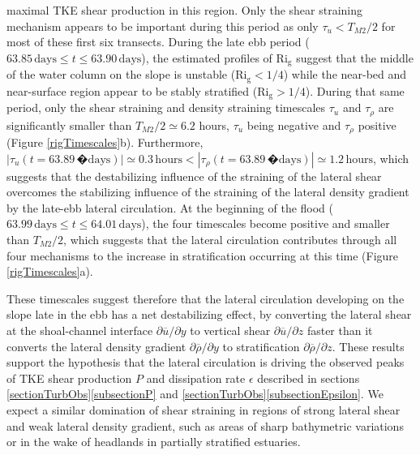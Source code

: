 maximal TKE shear production in this region. Only the shear straining mechanism appears to be important during this period as only $\tau_{u} < T_{M2} / 2$ for most of these first six transects. During the late ebb period ($63.85\, \mathrm{days} \leq t \leq 63.90 \, \mathrm{days}$), the estimated profiles of $\mathrm{Ri_g}$ suggest that the middle of the water column on the slope is unstable ($\mathrm{Ri_g} < 1/4$) while the near-bed and near-surface region appear to be stably stratified ($\mathrm{Ri_g} > 1/4$). During that same period, only the shear straining and density straining timescales $\tau_{u}$ and $\tau_{\rho}$ are significantly smaller than $T_{M2} / 2 \simeq 6.2$ hours, $\tau_{u}$ being negative and  $\tau_{\rho}$ positive (Figure \ref{rigTimescales}b). Furthermore, $\left| \tau_u(t=63.89 \,�\mathrm{days}) \right| \simeq 0.3 \, \mathrm{hours} < \left| \tau_{\rho}(t=63.89 \,�\mathrm{days}) \right| \simeq 1.2 \, \mathrm{hours}$, which suggests that the destabilizing influence of the straining of the lateral shear overcomes the stabilizing influence of the straining of the lateral density gradient by the late-ebb lateral circulation. At the beginning of the flood ($63.99\, \mathrm{days} \leq t \leq 64.01 \, \mathrm{days}$), the four timescales become positive and smaller than $T_{M2} / 2 $, which suggests that the lateral circulation contributes through all four mechanisms to the increase in stratification occurring at this time (Figure \ref{rigTimescales}a). 

These timescales suggest therefore that the lateral circulation developing on the slope late in the ebb has a net destabilizing effect, by converting the lateral shear at the shoal-channel interface $\partial \overline{u} / \partial y$ to vertical shear $\partial \overline{u} / \partial z$ faster than it converts the lateral density gradient  $\partial \overline{\rho} / \partial y$ to stratification $\partial \overline{\rho} / \partial z$. These results support the hypothesis that the lateral circulation is driving the observed peaks of TKE shear production $P$ and dissipation rate $\epsilon$ described in sections \ref{sectionTurbObs}\ref{subsectionP} and \ref{sectionTurbObs}\ref{subsectionEpsilon}. We expect a similar domination of shear straining in regions of strong lateral shear and weak lateral density gradient, such as areas of sharp bathymetric variations or in the wake of headlands \parencite{Farmer:2002p3544} in partially stratified estuaries. 


